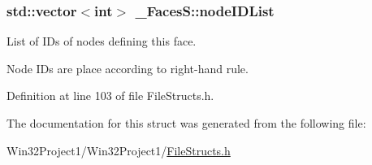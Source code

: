\subsubsection[{\texorpdfstring{node\+I\+D\+List}{nodeIDList}}]{\setlength{\rightskip}{0pt plus 5cm}std\+::vector$<$int$>$ \+\_\+\+Faces\+S\+::node\+I\+D\+List}\hypertarget{struct___faces_s_a1af35bd658b7be0f98e09deb5f8b3ead}{}\label{struct___faces_s_a1af35bd658b7be0f98e09deb5f8b3ead}


List of I\+Ds of nodes defining this face. 

Node I\+Ds are place according to right-\/hand rule. 

Definition at line 103 of file File\+Structs.\+h.



The documentation for this struct was generated from the following file\+:\begin{DoxyCompactItemize}
\item 
Win32\+Project1/\+Win32\+Project1/\hyperlink{_file_structs_8h}{File\+Structs.\+h}\end{DoxyCompactItemize}
